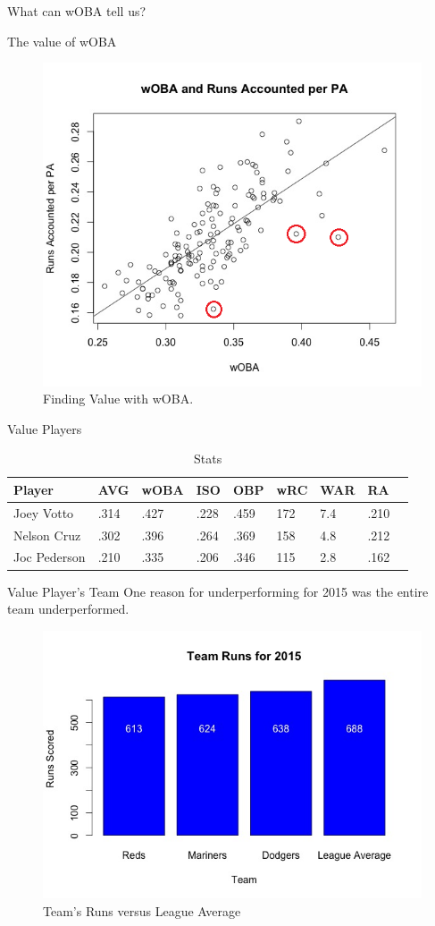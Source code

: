 \documentclass{beamer}
\begin{document}
\begin{frame}{What can wOBA tell us?}

\begin{block}{The value of wOBA}

\begin{figure}
\includegraphics[width= 3 in]{wOBA.png}
\caption{Finding Value with wOBA.}
\end{figure}

\end{block}

\end{frame}

\begin{frame}{Value Players}

\begin{table}[]
\centering
\caption{Stats}
\label{my-label}
\begin{tabular}{|l|l|l|l|l|l|l|l|l|}
\hline
Player       & AVG  & wOBA & ISO  & OBP  & wRC & WAR & RA        \\ \hline
Joey Votto   & .314 & .427 & .228 & .459 & 172 & 7.4 & .210      \\ \hline
Nelson Cruz  & .302 & .396 & .264 & .369 & 158 & 4.8 & .212      \\ \hline
Joc Pederson & .210 & .335 & .206 & .346 & 115 & 2.8 & .162      \\ \hline
\end{tabular}
\end{table}

\end{frame}


\begin{frame}{Value Player's Team}
One reason for underperforming for 2015 was the entire team underperformed.

\begin{figure}
\includegraphics[width= 3 in]{TeamRuns.jpeg}
\caption{\label{fig:your-figure}Team's Runs versus League Average}
\end{figure}
\end{frame}
\end{document}
